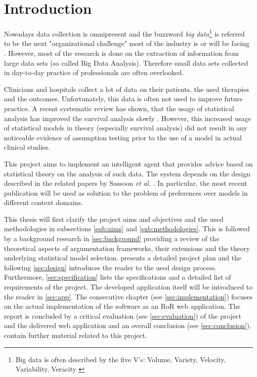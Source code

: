 \section{Introduction}

Nowadays data collection is omnipresent and the buzzword \textit{big data}\footnote{Big data is often described by the five V's: Volume, Variety, Velocity, Variability, Veracity \cite{Hilbert2015}} is referred to be the next "organizational challenge" most of the industry is or will be facing \cite{bigdata}. However, most of the research is done on the extraction of information from large data sets (so called Big Data Analysis). Therefore small data sets collected in day-to-day practice of professionals are often overlooked. 

Clinicians and hospitals collect a lot of data on their patients, the used therapies and the outcomes. Unfortunately, this data is often not used to improve future practice. A recent systematic review has shown, that the usage of statistical analysis has improved the survival analysis slowly \cite{survivalAnalysis}. However, this increased usage of statistical models in theory (especially survival analysis) did not result in any noticeable evidence of assumption testing prior to the use of a model in actual clinical studies.

This project aims to implement an intelligent agent that provides advice based on statistical theory on the analysis of such data. The system depends on the design described in the related papers by Sassoon \textit{et al.} \cite{sassoon2016,sassoon2014,sassoon2016CD}. In particular, the most recent publication will be used as solution to the problem of preferences over models in different context domains. 


This thesis will first clarify the project aims and objectives and the used methodologies in subsections \ref{sub:aims} and \ref{sub:methodologies}. This is followed by a background research in \autoref{sec:background} providing a review of the theoretical aspects of argumentation frameworks, their extensions and the theory underlying statistical model selection. 
 presents a detailed project plan and the following \autoref{sec:design} introduces the reader to the used design process. Furthermore, \autoref{sec:specification} lists the specifications and a detailed list of requirements of the project. The developed application itself will be introduced to the reader in \autoref{sec:app}. The consecutive chapter (see \autoref{sec:implementation}) focuses on the actual implementation of the software as an \gls{RoR} web application. 
The report is concluded by a critical evaluation (see \autoref{sec:evaluation}) of the project and the delivered web application and an overall conclusion (see \autoref{sec:conclusion}).
 contain further material related to this project.


